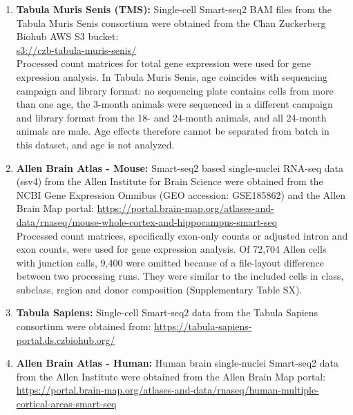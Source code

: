 \begin{enumerate}
\item \textbf{Tabula Muris Senis (TMS):} Single-cell Smart-seq2 BAM files from the Tabula Muris Senis consortium \cite{Tabula_Muris_Consortium2020-ga} were obtained from the Chan Zuckerberg Biohub AWS S3 bucket:\\
{\footnotesize \url{s3://czb-tabula-muris-senis/}}\\
Processed count matrices for total gene expression were used for gene expression analysis. In Tabula Muris Senis, age coincides with sequencing campaign and library format: no sequencing plate contains cells from more than one age, the 3-month animals were sequenced in a different campaign and library format from the 18- and 24-month animals, and all 24-month animals are male. Age effects therefore cannot be separated from batch in this dataset, and age is not analyzed.

\item \textbf{Allen Brain Atlas - Mouse:} Smart-seq2 based single-nuclei RNA-seq data (ssv4) from the Allen Institute for Brain Science \cite{mouse-allen-brain-ssv4} were obtained from the NCBI Gene Expression Omnibus (GEO accession: GSE185862) and the Allen Brain Map portal:
{\footnotesize \url{https://portal.brain-map.org/atlases-and-data/rnaseq/mouse-whole-cortex-and-hippocampus-smart-seq}}\\
Processed count matrices, specifically exon-only counts or adjusted intron and exon counts, were used for gene expression analysis. Of 72,704 Allen cells with junction calls, 9,400 were omitted because of a file-layout difference between two processing runs. They were similar to the included cells in class, subclass, region and donor composition (Supplementary Table SX).

\item \textbf{Tabula Sapiens:} Single-cell Smart-seq2 data from the Tabula Sapiens consortium \cite{Tabula_Sapiens,TabulaSapienV2} were obtained from:
{\footnotesize \url{https://tabula-sapiens-portal.ds.czbiohub.org/}}\\

\item \textbf{Allen Brain Atlas - Human:} Human brain single-nuclei Smart-seq2 data from the Allen Institute were obtained from the Allen Brain Map portal:\\
{\footnotesize \url{https://portal.brain-map.org/atlases-and-data/rnaseq/human-multiple-cortical-areas-smart-seq}}
\end{enumerate}

